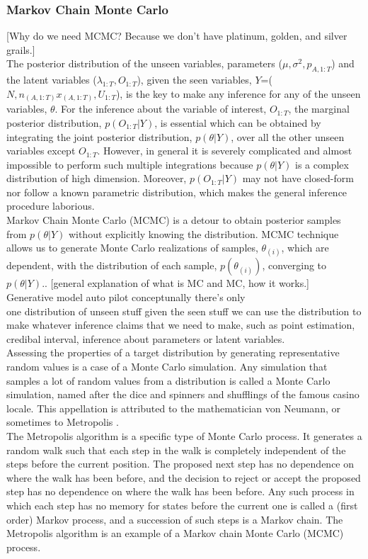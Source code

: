 \documentclass[12pt]{article}
\begin{document}
{\subsubsection{Markov Chain Monte Carlo}

[Why do we need MCMC? Because we don't have platinum, golden, and silver grails.]\\
The posterior distribution of the unseen variables, parameters ($\mu, \sigma^2, p_{A,1:T}$) and the latent variables ($\lambda_{1:T}, O_{1:T}$), given the seen variables, $Y$=($N, n_{(A,1:T)} x_{(A,1:T)}, U_{1:T}$), is the key to make any inference for any of the unseen variables, $\theta$. For the inference about the variable of interest, $O_{1:T}$, the marginal posterior distribution, $p(O_{1:T}|Y)$, is essential which can be obtained by integrating the joint posterior distribution, $p(\theta|Y)$, over all the other unseen variables except $O_{1:T}$. 
However, in general it is severely complicated and almost impossible to perform such multiple integrations because $p(\theta|Y)$ is a complex distribution of high dimension. Moreover, $p(O_{1:T}|Y)$ may not have closed-form nor follow a known parametric distribution, which makes the general inference procedure laborious.\\ 
Markov Chain Monte Carlo (MCMC) is a detour to obtain posterior samples from $p(\theta|Y)$ without explicitly knowing the distribution.  MCMC technique allows us to generate Monte Carlo realizations of samples, $\theta_{(i)}$, which are dependent, with the distribution of each sample, $p(\theta_{(i)})$, converging to $p(\theta|Y)$.\cite{paul}.
[general explanation of what is MC and MC, how it works.]\\ 


 Generative model auto pilot conceptunally there's only\\
 one distribution of unseen stuff given the seen stuff we can use the distribution to make whatever inference claims that we need to make, such as point estimation, credibal interval, inference about parameters or latent variables.\\
 Assessing the properties of a target distribution by generating representative random values is a case of a Monte Carlo simulation. Any simulation that samples a lot of random values from a distribution is called a Monte Carlo simulation, named after the dice and spinners and shufflings of the famous casino locale. This appellation is attributed to the mathematician von Neumann, or sometimes to Metropolis \cite{gill}.\\
 The Metropolis algorithm is a specific type of Monte Carlo process. It generates a random walk such that each step in the walk is completely independent of the steps before the current position. The proposed next step has no dependence on where the walk has been before, and the decision to reject or accept the proposed step has no dependence on where the walk has been before. Any such process in which each step has no memory for states before the current one is called a (first order) Markov process, and a succession of such steps is a Markov chain. The Metropolis algorithm is an example of a Markov chain Monte Carlo (MCMC) process. \cite{doing_bayes}\\
 
}
\end{document}
